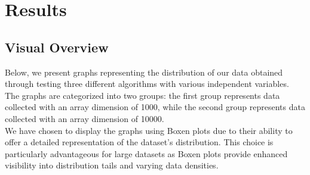 \documentclass{article}
\begin{document}
\section{Results}
\subsection{Visual Overview}

Below, we present graphs representing the distribution of our data obtained through testing three different algorithms with various independent variables. The graphs are categorized into two groups: the first group represents data collected with an array dimension of 1000, while the second group represents data collected with an array dimension of 10000.\\

We have chosen to display the graphs using Boxen plots due to their ability to offer a detailed representation of the dataset's distribution. This choice is particularly advantageous for large datasets as Boxen plots provide enhanced visibility into distribution tails and varying data densities.\\
\end{document}
